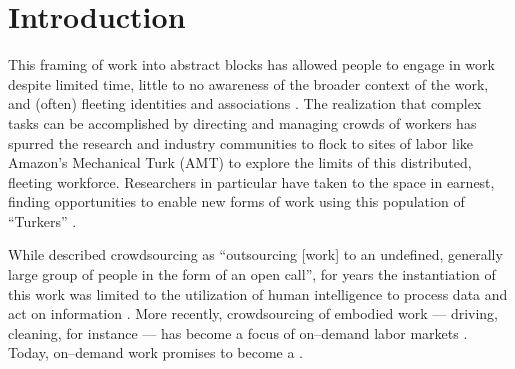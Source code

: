 \documentclass[trackingWork]{subfiles}
\begin{document}
\section{Introduction}
This framing of work into  abstract blocks
has allowed people to engage in work despite
limited time,
little to no awareness of the broader context of the work, and 
(often) fleeting identities and associations
\cite{kargerIterativeLearning,mitraComparingStrategies,latozaCrowdDev}.
The realization
that complex tasks can be accomplished by directing and managing crowds of workers
has spurred the research and industry communities to flock to sites of labor
like Amazon's Mechanical Turk (AMT)
to explore the limits of this distributed,  fleeting workforce.
Researchers in particular  have taken to the space in earnest,
finding opportunities to enable new forms of work
using this population of ``Turkers''
\cite{bernsteinSoylent,redballoon,paolacci2010running}.

While \citeauthor{howe2008crowdsourcing} described crowdsourcing as
``outsourcing [work] to an undefined, generally large group of people in the form of an open call'',
for years the instantiation of this work was limited to the utilization of
human intelligence to process data and act on information
\cite{CrowdsourcingUserStudies,movieSummarizationWu,
      yuenSurvey,geiger2011managing,quinnbedersonTaxonomy}.
More recently, crowdsourcing of embodied work
--- driving, cleaning, for instance ---
has become a focus of on--demand labor markets
\cite{uberAlgorithm,uberOfficial,zaarlyOfficial,taskrabbitOfficial}.
Today, on--demand work promises to become a 
.
\end{document}
